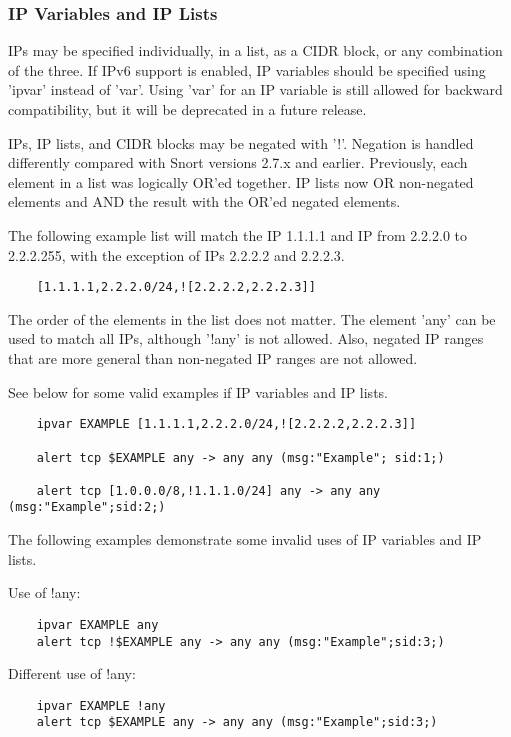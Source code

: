 \documentclass[english]{report}
\begin{document}
\subsubsection{IP Variables and IP Lists}
IPs may be specified individually, in a list, as a CIDR block, or any
combination of the three.  If IPv6 support is enabled, IP variables 
should be specified using 'ipvar' instead of 'var'.  Using 'var' for 
an IP variable is still allowed for backward compatibility, but it will 
be deprecated in a future release.

IPs, IP lists, and CIDR blocks may be negated with '!'.  Negation is handled
differently compared with Snort versions 2.7.x and earlier.  Previously, each
element in a list was logically OR'ed together.  IP lists now OR non-negated
elements and AND the result with the OR'ed negated elements.  

The following example list will match the IP 1.1.1.1 and IP from 2.2.2.0 to 
2.2.2.255, with the exception of IPs 2.2.2.2 and 2.2.2.3.

\begin{verbatim}
    [1.1.1.1,2.2.2.0/24,![2.2.2.2,2.2.2.3]] 
\end{verbatim}

The order of the elements in the list does not matter.  The element 'any' can be 
used to match all IPs, although '!any' is not allowed.  Also, negated IP ranges
that are more general than non-negated IP ranges are not allowed.  

See below for some valid examples if IP variables and IP lists.

\begin{verbatim}
    ipvar EXAMPLE [1.1.1.1,2.2.2.0/24,![2.2.2.2,2.2.2.3]] 
    
    alert tcp $EXAMPLE any -> any any (msg:"Example"; sid:1;)

    alert tcp [1.0.0.0/8,!1.1.1.0/24] any -> any any (msg:"Example";sid:2;)
\end{verbatim}

The following examples demonstrate some invalid uses of IP variables and IP lists.

Use of !any:
\begin{verbatim}
    ipvar EXAMPLE any
    alert tcp !$EXAMPLE any -> any any (msg:"Example";sid:3;)
\end{verbatim}

Different use of !any:

\begin{verbatim}
    ipvar EXAMPLE !any
    alert tcp $EXAMPLE any -> any any (msg:"Example";sid:3;)
\end{verbatim}
        
\end{document}
